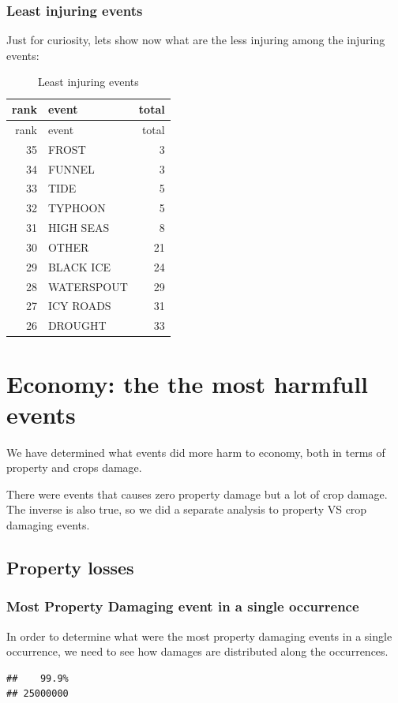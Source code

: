 \subsubsection{Least injuring events}\label{least-injuring-events}

Just for curiosity, lets show now what are the less injuring among the
injuring events:

\begin{longtable}[]{@{}rlr@{}}
\caption{Least injuring events}\tabularnewline
\toprule
rank & event & total\tabularnewline
\midrule
\endfirsthead
\toprule
rank & event & total\tabularnewline
\midrule
\endhead
35 & FROST & 3\tabularnewline
34 & FUNNEL & 3\tabularnewline
33 & TIDE & 5\tabularnewline
32 & TYPHOON & 5\tabularnewline
31 & HIGH SEAS & 8\tabularnewline
30 & OTHER & 21\tabularnewline
29 & BLACK ICE & 24\tabularnewline
28 & WATERSPOUT & 29\tabularnewline
27 & ICY ROADS & 31\tabularnewline
26 & DROUGHT & 33\tabularnewline
\bottomrule
\end{longtable}

\section{Economy: the the most harmfull
events}\label{economy-the-the-most-harmfull-events}

We have determined what events did more harm to economy, both in terms
of property and crops damage.

There were events that causes zero property damage but a lot of crop
damage. The inverse is also true, so we did a separate analysis to
property VS crop damaging events.

\subsection{Property losses}\label{property-losses}

\subsubsection{Most Property Damaging event in a single
occurrence}\label{most-property-damaging-event-in-a-single-occurrence}

In order to determine what were the most property damaging events in a
single occurrence, we need to see how damages are distributed along the
occurrences.

\begin{verbatim}
##    99.9% 
## 25000000
\end{verbatim}

